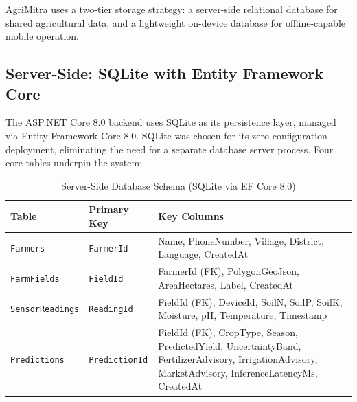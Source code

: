 AgriMitra uses a two-tier storage strategy: a server-side relational database for shared agricultural data, and a lightweight on-device database for offline-capable mobile operation.

\subsection*{Server-Side: SQLite with Entity Framework Core}

The ASP.NET Core 8.0 backend uses SQLite as its persistence layer, managed via Entity Framework Core 8.0. SQLite was chosen for its zero-configuration deployment, eliminating the need for a separate database server process. Four core tables underpin the system:

\begin{table}[H]
\centering
\caption{Server-Side Database Schema (SQLite via EF Core 8.0)}
\label{tab:db_schema}
\begin{tabular}{|l|l|p{7cm}|}
\hline
\textbf{Table} & \textbf{Primary Key} & \textbf{Key Columns} \\
\hline
\texttt{Farmers} & \texttt{FarmerId} & Name, PhoneNumber, Village, District, Language, CreatedAt \\
\hline
\texttt{FarmFields} & \texttt{FieldId} & FarmerId (FK), PolygonGeoJson, AreaHectares, Label, CreatedAt \\
\hline
\texttt{SensorReadings} & \texttt{ReadingId} & FieldId (FK), DeviceId, SoilN, SoilP, SoilK, Moisture, pH, Temperature, Timestamp \\
\hline
\texttt{Predictions} & \texttt{PredictionId} & FieldId (FK), CropType, Season, PredictedYield, UncertaintyBand, FertilizerAdvisory, IrrigationAdvisory, MarketAdvisory, InferenceLatencyMs, CreatedAt \\
\hline
\end{tabular}
\end{table}

